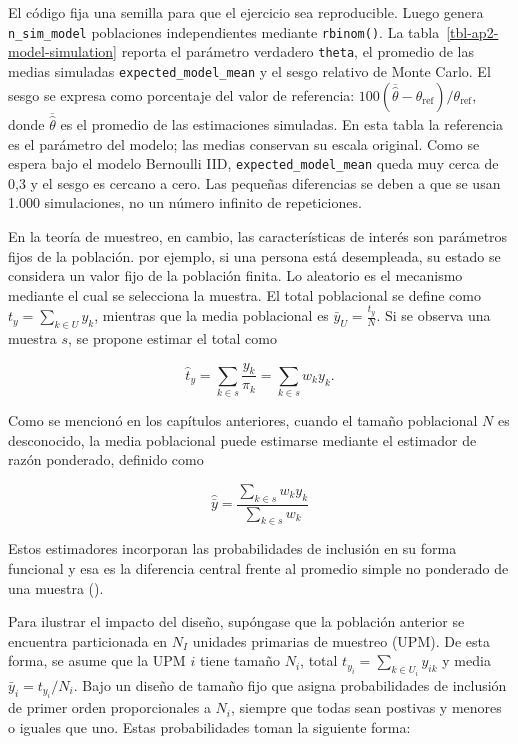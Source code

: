 \documentclass[
  spanish,
  11pt,
  letterpaper,
  oneside,
  open=any]{scrbook}
\begin{document}
El código fija una semilla para que el ejercicio sea reproducible. Luego
genera \texttt{n\_sim\_model} poblaciones independientes mediante
\texttt{rbinom()}. La tabla~\ref{tbl-ap2-model-simulation} reporta el
parámetro verdadero \texttt{theta}, el promedio de las medias simuladas
\texttt{expected\_model\_mean} y el sesgo relativo de Monte Carlo. El
sesgo se expresa como porcentaje del valor de referencia:
\(100(\overline{\hat\theta}-\theta_{\mathrm{ref}})/\theta_{\mathrm{ref}}\),
donde \(\overline{\hat\theta}\) es el promedio de las estimaciones
simuladas. En esta tabla la referencia es el parámetro del modelo; las
medias conservan su escala original. Como se espera bajo el modelo
Bernoulli IID, \texttt{expected\_model\_mean} queda muy cerca de 0,3 y
el sesgo es cercano a cero. Las pequeñas diferencias se deben a que se
usan 1.000 simulaciones, no un número infinito de repeticiones.

En la teoría de muestreo, en cambio, las características de interés son
parámetros fijos de la población. por ejemplo, si una persona está
desempleada, su estado se considera un valor fijo de la población
finita. Lo aleatorio es el mecanismo mediante el cual se selecciona la
muestra. El total poblacional se define como
\(t_y = \sum_{k \in U} y_k\), mientras que la media poblacional es
\(\bar{y}_U = \frac{t_y}{N}\). Si se observa una muestra \(s\), se
propone estimar el total como

\[
\hat{t}_{y} = \sum_{k \in s}\frac{y_k}{\pi_k}
= \sum_{k \in s}w_k y_k.
\]

Como se mencionó en los capítulos anteriores, cuando el tamaño
poblacional \(N\) es desconocido, la media poblacional puede estimarse
mediante el estimador de razón ponderado, definido como

\[
\hat{\bar{y}} =
\frac{\sum_{k \in s}w_k y_k}
{\sum_{k \in s}w_k}
\]

Estos estimadores incorporan las probabilidades de inclusión en su forma
funcional y esa es la diferencia central frente al promedio simple no
ponderado de una muestra ().

Para ilustrar el impacto del diseño, supóngase que la población anterior
se encuentra particionada en \(N_I\) unidades primarias de muestreo
(UPM). De esta forma, se asume que la UPM \(i\) tiene tamaño \(N_i\),
total \(t_{y_i}=\sum_{k \in U_i}y_{ik}\) y media
\(\bar{y}_i=t_{y_i}/N_i\). Bajo un diseño de tamaño fijo que asigna
probabilidades de inclusión de primer orden proporcionales a \(N_i\),
siempre que todas sean postivas y menores o iguales que uno. Estas
probabilidades toman la siguiente forma:
\end{document}
